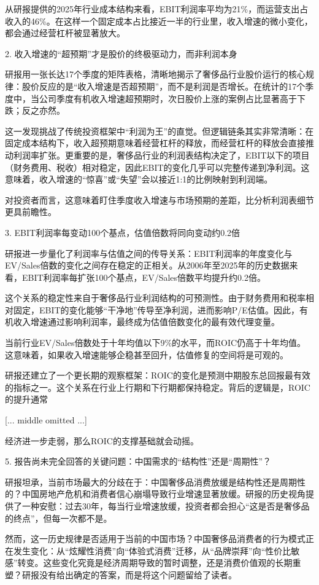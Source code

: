 \documentclass[11pt]{ctexart}
\begin{document}
从研报提供的2025年行业成本结构来看，EBIT利润率平均为21\%，而运营支出占收入的46\%。在这样一个固定成本占比接近一半的行业里，收入增速的微小变化，都会通过经营杠杆被显著放大。

2. 收入增速的“超预期”才是股价的终极驱动力，而非利润本身

研报用一张长达17个季度的矩阵表格，清晰地揭示了奢侈品行业股价运行的核心规律：股价反应的是“收入增速是否超预期”，而不是利润是否增长。在统计的17个季度中，当公司季度有机收入增速超预期时，次日股价上涨的案例占比显著高于下跌；反之亦然。

这一发现挑战了传统投资框架中“利润为王”的直觉。但逻辑链条其实非常清晰：在固定成本结构下，收入超预期意味着经营杠杆的释放，而经营杠杆的释放会直接推动利润率扩张。更重要的是，奢侈品行业的利润表结构决定了，EBIT以下的项目（财务费用、税收）相对稳定，因此EBIT的变化几乎可以完整传递到净利润。这意味着，收入增速的“惊喜”或“失望”会以接近1:1的比例映射到利润端。

对投资者而言，这意味着盯住季度收入增速与市场预期的差距，比分析利润表细节更具前瞻性。

3. EBIT利润率每变动100个基点，估值倍数将同向变动约0.2倍

研报进一步量化了利润率与估值之间的传导关系：EBIT利润率的年度变化与EV/Sales倍数的变化之间存在稳定的正相关。从2006年至2025年的历史数据来看，EBIT利润率每扩张100个基点，EV/Sales倍数平均提升约0.2倍。

这个关系的稳定性来自于奢侈品行业利润结构的可预测性。由于财务费用和税率相对固定，EBIT的变化能够“干净地”传导至净利润，进而影响P/E估值。因此，有机收入增速通过影响利润率，最终成为估值倍数变化的最有效代理变量。

当前行业EV/Sales倍数处于十年均值以下9\%的水平，而ROIC仍高于十年均值。这意味着，如果收入增速能够企稳甚至回升，估值修复的空间将是可观的。

研报还建立了一个更长期的观察框架：ROIC的变化是预测中期股东总回报最有效的指标之一。这个关系在行业上行期和下行期都保持稳定。背后的逻辑是，ROIC的提升通常

[... middle omitted ...]

经济进一步走弱，那么ROIC的支撑基础就会动摇。

5. 报告尚未完全回答的关键问题：中国需求的“结构性”还是“周期性”？

研报坦承，当前市场最大的分歧在于：中国奢侈品消费放缓是结构性还是周期性的？中国房地产危机和消费者信心崩塌导致行业增速显著放缓。研报的历史视角提供了一种安慰：过去30年，每当行业增速放缓，投资者都会担心“这是否是奢侈品的终点”，但每一次都不是。

然而，这一历史规律是否适用于当前的中国市场？中国奢侈品消费者的行为模式正在发生变化：从“炫耀性消费”向“体验式消费”迁移，从“品牌崇拜”向“性价比敏感”转变。这些变化究竟是经济周期导致的暂时调整，还是消费价值观的长期重塑？研报没有给出确定的答案，而是将这个问题留给了读者。
\end{document}
